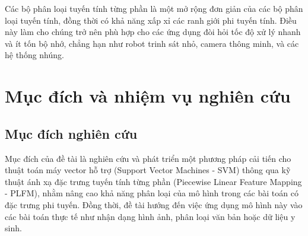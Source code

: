 Các bộ phân loại tuyến tính từng phần là một mở rộng đơn giản của các bộ phân loại tuyến tính, đồng thời có khả năng xấp xỉ các ranh giới phi tuyến tính. Điều này làm cho chúng trở nên phù hợp cho các ứng dụng đòi hỏi tốc độ xử lý nhanh và ít tốn bộ nhớ, chẳng hạn như robot trinh sát nhỏ, camera thông minh, và các hệ thống nhúng.

\section*{Mục đích và nhiệm vụ nghiên cứu}
\subsection*{Mục đích nghiên cứu}
Mục đích của đề tài là nghiên cứu và phát triển một phương pháp cải tiến cho thuật toán máy vector hỗ trợ (Support Vector Machines - SVM) thông qua kỹ thuật ánh xạ đặc trưng tuyến tính từng phần (Piecewise Linear Feature Mapping - PLFM), nhằm nâng cao khả năng phân loại của mô hình trong các bài toán có đặc trưng phi tuyến. Đồng thời, đề tài hướng đến việc ứng dụng mô hình này vào các bài toán thực tế như nhận dạng hình ảnh, phân loại văn bản hoặc dữ liệu y sinh.

